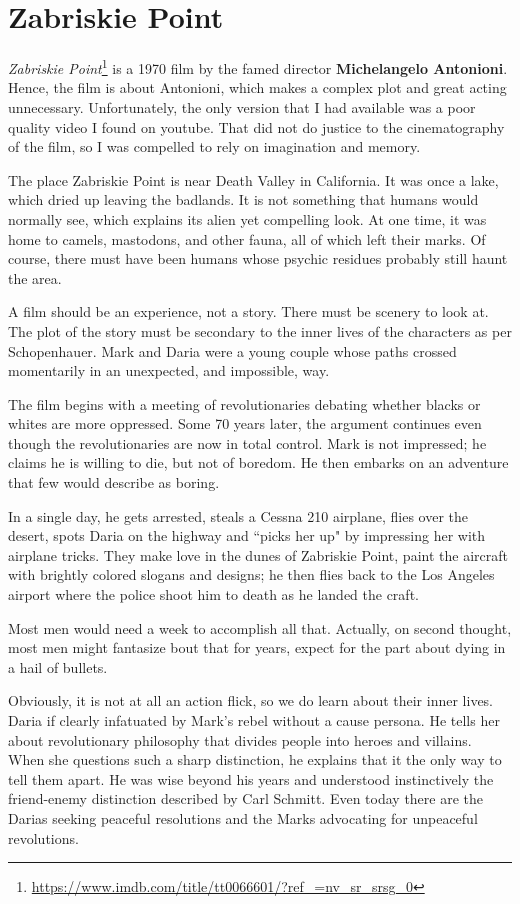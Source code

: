 \section{Zabriskie Point}

\emph{Zabriskie Point}\footnote{\url{https://www.imdb.com/title/tt0066601/?ref_=nv_sr_srsg_0}} is a 1970 film by the famed director \textbf{Michelangelo Antonioni}. Hence, the film is about
Antonioni, which makes a complex plot and great acting unnecessary. Unfortunately, the only version that I had
available was a poor quality video I found on youtube. That did not do justice to the cinematography of the film, so I
was compelled to rely on imagination and memory.

The place Zabriskie Point is near Death Valley in California. It was once a lake, which dried up leaving the badlands.
It is not something that humans would normally see, which explains its alien yet compelling look. At one time, it was
home to camels, mastodons, and other fauna, all of which left their marks. Of course, there must have been humans whose
psychic residues probably still haunt the area.

A film should be an experience, not a story. There must be scenery to look at. The plot of the story must be secondary
to the inner lives of the characters as per Schopenhauer. Mark and Daria were a young couple whose paths crossed
momentarily in an unexpected, and impossible, way.

The film begins with a meeting of revolutionaries debating whether blacks or whites are more oppressed. Some 70 years
later, the argument continues even though the revolutionaries are now in total control. Mark is not impressed; he
claims he is willing to die, but not of boredom. He then embarks on an adventure that few would describe as boring.

In a single day, he gets arrested, steals a Cessna 210 airplane, flies over the desert, spots Daria on the highway and
``picks her up" by impressing her with airplane tricks. They make love in the dunes of Zabriskie Point, paint the
aircraft with brightly colored slogans and designs; he then flies back to the Los Angeles airport where the police
shoot him to death as he landed the craft.

Most men would need a week to accomplish all that. Actually, on second thought, most men might fantasize bout that for
years, expect for the part about dying in a hail of bullets.

Obviously, it is not at all an action flick, so we do learn about their inner lives. Daria if clearly infatuated by
Mark's rebel without a cause persona. He tells her about revolutionary philosophy that divides
people into heroes and villains. When she questions such a sharp distinction, he explains that it the only way to tell
them apart. He was wise beyond his years and understood instinctively the friend-enemy distinction described by Carl
Schmitt. Even today there are the Darias seeking peaceful resolutions and the Marks advocating for unpeaceful
revolutions.

